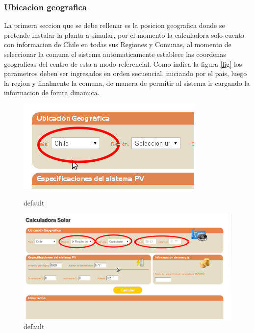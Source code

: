 \subsubsection{Ubicacion geografica}
La primera seccion que se debe rellenar es la posicion geografica donde se pretende instalar la planta a simular, por el momento la calculadora solo cuenta con informacion de Chile en todas sus Regiones y Comunas, al momento de seleccionar la comuna 
el sistema automaticamente establece las coordenas geograficas del centro de esta a modo referencial. Como indica la figura \ref{fig} los parametros deben ser ingresados en orden secuencial, iniciando por el pais, luego la region y finalmente la comuna, de manera de permitir al sistema ir cargando la informacion de fomra dinamica.
\begin{figure}[ht]
        \begin{minipage}[b]{0.45\linewidth}
                \centering
                \includegraphics[width=\textwidth]{./images/cap5chap1img7-1}
                \caption{default}
                \label{fig:figure1}
        \end{minipage}
        \begin{minipage}[b]{0.45\linewidth}
                \centering
                \includegraphics[width=\textwidth]{./images/cap5chap1img7-2}
                \caption{default}
                \label{fig:figure1}
        \end{minipage}
\end{figure}

